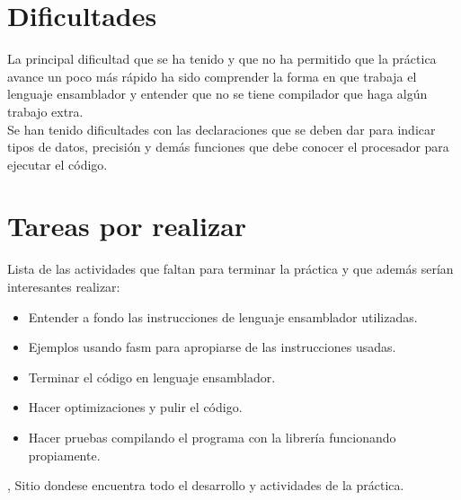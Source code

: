 \documentclass[%
	final,
	notitlepage,
	narroweqnarray,
	inline,
	twoside,
	]{ieee}
\begin{document}
\section{Dificultades}

La principal dificultad que se ha tenido y que no ha permitido que la práctica
avance un poco más rápido ha sido comprender la forma en que trabaja
el lenguaje ensamblador y entender que no se tiene compilador que haga 
algún trabajo extra.\\
Se han tenido dificultades con las
declaraciones que se deben dar para indicar tipos de datos, precisión y demás funciones
que debe conocer el procesador para ejecutar el código.
\\ 
\section{Tareas por realizar}

Lista de las actividades que faltan para terminar la práctica y
que además serían interesantes realizar:
\begin{itemize}
\item Entender a fondo las instrucciones de lenguaje
ensamblador utilizadas.
\item Ejemplos usando fasm para apropiarse de las
instrucciones usadas.
\item Terminar el código en lenguaje ensamblador.
\item Hacer optimizaciones y pulir el código.
\item Hacer pruebas compilando el programa con 
la librería funcionando propiamente.
\end{itemize}



\begin{thebibliography}{1}

,
\newblock Sitio dondese encuentra todo el desarrollo y actividades de la práctica.

\end{thebibliography}

\end{document}
